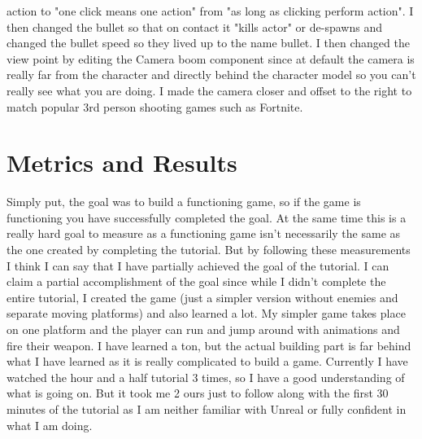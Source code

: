 \documentclass[10pt, twocolumn]{article}
\begin{document}
action to "one click means one action" from "as long as clicking perform action". I then changed the bullet so that on contact it "kills actor" or de-spawns and changed the bullet speed so they lived up to the name bullet. I then changed the view point by editing the Camera boom component since at default the camera is really far from the character and directly behind the character model so you can't really see what you are doing. I made the camera closer and offset to the right to match popular 3rd person shooting games such as Fortnite.

 \section{Metrics and Results}
Simply put, the goal was to build a functioning game, so if the game is functioning you have successfully completed the goal. At the same time this is a really hard goal to measure as a functioning game isn't necessarily the same as the one created by completing the tutorial. But by following these measurements I think I can say that I have partially achieved the goal of the tutorial. I can claim a partial accomplishment of the goal since while I didn't complete the entire tutorial, I created the game (just a simpler version without enemies and separate moving platforms) and also learned a lot. My simpler game takes place on one platform and the player can run and jump around with animations and fire their weapon. I have learned a ton, but the actual building part is far behind what I have learned as it is really complicated to build a game. Currently I have watched the hour and a half tutorial 3 times, so I have a good understanding of what is going on. But it took me 2 ours just to follow along with the first 30 minutes of the tutorial as I am neither familiar with Unreal or fully confident in what I am doing. 
\end{document}
